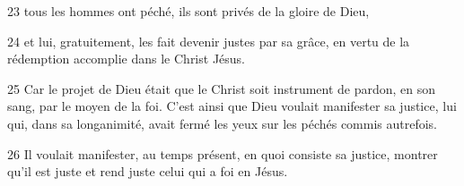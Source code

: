 
23 tous les hommes ont péché, ils sont privés de la gloire de Dieu,

24 et lui, gratuitement, les fait devenir justes par sa grâce, en vertu de la rédemption accomplie dans le Christ Jésus.

25 Car le projet de Dieu était que le Christ soit instrument de pardon, en son sang, par le moyen de la foi. C’est ainsi que Dieu voulait manifester sa justice, lui qui, dans sa longanimité, avait fermé les yeux sur les péchés commis autrefois.

26 Il voulait manifester, au temps présent, en quoi consiste sa justice, montrer qu’il est juste et rend juste celui qui a foi en Jésus.
